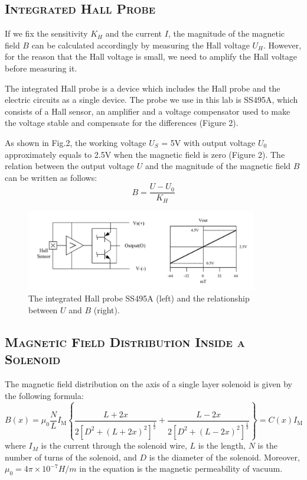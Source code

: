 \documentclass[a4paper,12pt]{article}
\begin{document}
\subsection{\textsc{Integrated Hall Probe}}
If we fix the sensitivity $K_H$ and the current $I$, the magnitude of the magnetic field $B$ can be calculated accordingly by measuring the Hall voltage $U_H$. However, for the reason that the Hall voltage is small, we need to amplify the Hall voltage before measuring it.

The integrated Hall probe is a device which includes the Hall probe and the electric circuits as a single device. The probe we use in this lab is SS495A, which consists of a Hall sensor, an amplifier and a voltage compensator used to make the voltage stable and compensate for the differences (Figure 2).

As shown in Fig.2, the working voltage $U_S$ = 5V with output voltage $U_0$ approximately equals to 2.5V when the magnetic field is zero (Figure 2). The relation between the output voltage $U$ and the magnitude of the magnetic field $B$ can be written as follows:
\begin{equation}
B = \frac{U - U_0}{K_H}
\end{equation}

\begin{figure}[htb] 
    \centering
    \includegraphics[width=0.9\textwidth]{Fig2} 
    \caption{The integrated Hall probe SS495A (left) and the relationship between $U$ and $B$ (right).\cite{labmanual}} 
\end{figure}

\subsection{\textsc{Magnetic Field Distribution Inside a Solenoid}}
The magnetic field distribution on the axis of a single layer solenoid is given by the following formula:
\begin{equation}
B(x)=\mu_{0} \frac{N}{L} I_{\mathrm{M}}\left\{\frac{L+2 x}{2\left[D^{2}+(L+2 x)^{2}\right]^{\frac{1}{2}}}+\frac{L-2 x}{2\left[D^{2}+(L-2 x)^{2}\right]^{\frac{1}{2}}}\right\}=C(x) I_{\mathrm{M}}
\end{equation}
where $I_M$ is the current through the solenoid wire, $L$ is the length, $N$ is the number of turns of the solenoid, and $D$ is the diameter of the solenoid. Moreover, $\mu_0 = 4\pi \times 10^{-7} H/m $ in the equation is the magnetic permeability of vacuum.
\end{document}
